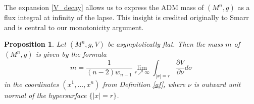 \documentclass[12pt]{amsart}
\newtheorem{proposition}[theorem]{Proposition}
\theoremstyle{definition}
\newtheorem{definition}[theorem]{Definition}
\numberwithin{equation}{section}
\begin{document}
The expansion \eqref{V_decay} allows us to express the ADM mass of $(M^{n},g)$ as a flux integral at infinity of the lapse. This insight is credited originally to Smarr \cite{S73} and is central to our monotonicity argument.

\begin{proposition} \label{mass_formula_theorem}
Let $(M^{n},g,V)$ be asymptotically flat. Then the mass $m$ of $(M^{n},g)$ is given by the formula
\begin{equation} \label{mass_formula}
     m = \frac{1}{(n-2)w_{n-1}} \lim_{r \nearrow \infty} \int_{|x| = r} \frac{\partial V}{\partial \nu} d\sigma
\end{equation}
in the coordinates $(x^{1},\dots,x^{n})$ from Definition \eqref{af}, where $\nu$ is outward unit normal of the hypersurface $\{ |x| = r \}$.
\end{proposition}
\end{document}
